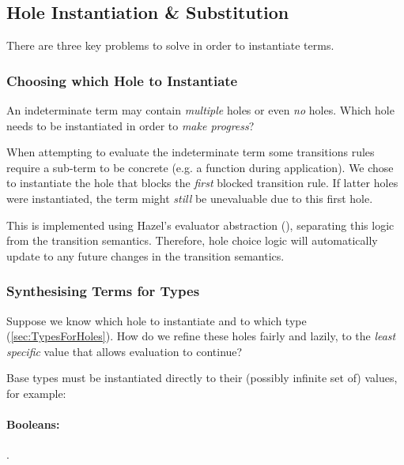 \subsection{Hole Instantiation \& Substitution}\label{sec:HoleInstantiation}
There are three key problems to solve in order to instantiate terms.

\subsubsection{Choosing which Hole to Instantiate}
\label{sec:ChooseHole}
An indeterminate term may contain \textit{multiple} holes or even \textit{no} holes. Which hole needs to be instantiated in order to \textit{make progress}?

When attempting to evaluate the indeterminate term some transitions rules require a sub-term to be concrete (e.g. a function during application). We chose to instantiate the hole that blocks the \textit{first} blocked transition rule. If latter holes were instantiated, the term might \textit{still} be unevaluable due to this first hole.

This is implemented using Hazel's evaluator abstraction (), separating this logic from the transition semantics. Therefore, hole choice logic will automatically update to any future changes in the transition semantics.

\subsubsection{Synthesising Terms for Types}
Suppose we know which hole to instantiate and to which type (\cref{sec:TypesForHoles}). How do we refine these holes fairly and lazily, to the \textit{least specific} value that allows evaluation to continue?

Base types must be instantiated directly to their (possibly infinite set of) values, for example:
\paragraph{Booleans:} .

